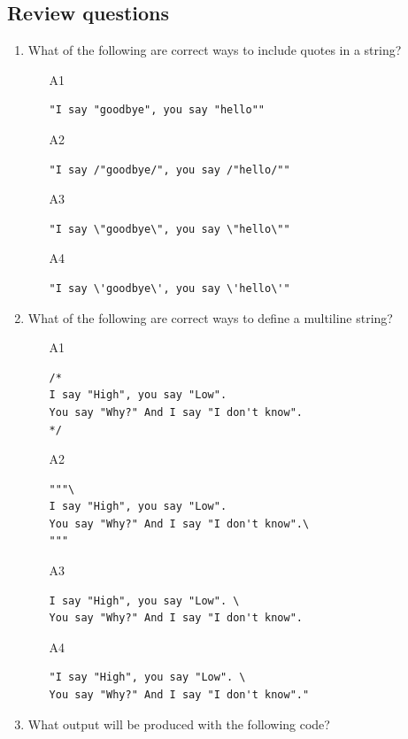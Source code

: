 \subsection{Review questions}

\begin{enumerate}
\item What of the following are correct ways to include quotes in a string?
\begin{enumerate}
\item[A1] 
\begin{verbatim}
"I say "goodbye", you say "hello""
\end{verbatim}
\item[A2] 
\begin{verbatim}
"I say /"goodbye/", you say /"hello/""
\end{verbatim}
\item[A3] 
\begin{verbatim}
"I say \"goodbye\", you say \"hello\""
\end{verbatim}
\item[A4] 
\begin{verbatim}
"I say \'goodbye\', you say \'hello\'"
\end{verbatim}
\end{enumerate}
\item What of the following are correct ways to define a multiline string?
\begin{enumerate}
\item[A1] 
\begin{verbatim}
/*
I say "High", you say "Low".
You say "Why?" And I say "I don't know".
*/
\end{verbatim}
\item[A2] 
\begin{verbatim}
"""\
I say "High", you say "Low".
You say "Why?" And I say "I don't know".\
"""
\end{verbatim}
\item[A3] 
\begin{verbatim}
I say "High", you say "Low". \
You say "Why?" And I say "I don't know".
\end{verbatim}
\item[A4] 
\begin{verbatim}
"I say "High", you say "Low". \
You say "Why?" And I say "I don't know"."
\end{verbatim}
\end{enumerate}
\item What output will be produced with the following code?

\end{enumerate}
